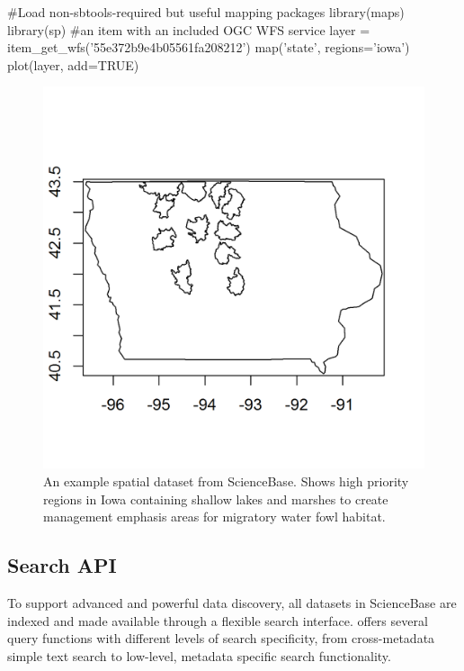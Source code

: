 \begin{example}
#Load non-sbtools-required but useful mapping packages
library(maps)
library(sp)
#an item with an included OGC WFS service
layer = item_get_wfs('55e372b9e4b05561fa208212')
map('state', regions='iowa')
plot(layer, add=TRUE)
\end{example}

 \begin{figure}[htbp]
   \centering
   \includegraphics{mapfig}
   \caption{An example spatial dataset from ScienceBase. 
   Shows high priority regions in Iowa containing shallow
   lakes and marshes to create management emphasis areas 
   for migratory water fowl habitat.}
   \label{figure:iowafig}
 \end{figure}


\subsection{Search API}
To support advanced and powerful data discovery, all datasets
in ScienceBase are indexed and made available through a flexible
search interface.  offers several query
functions with different levels of search specificity, from
cross-metadata simple text search to low-level, metadata specific search
functionality.

